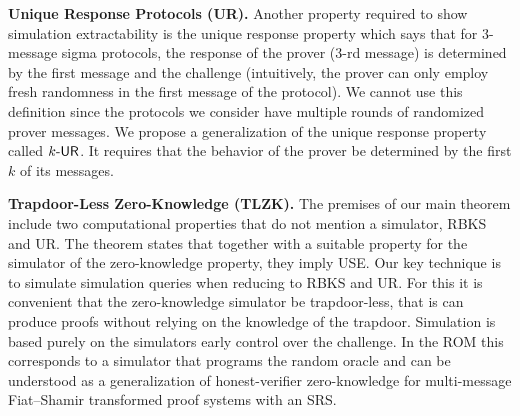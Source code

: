 \documentclass[11pt]{llncs}
\newcommand{\oursubsub}[1] {\smallskip\noindent\textbf{#1}}
\begin{document}
\oursubsub{Unique Response Protocols (UR).}  Another property
required to show simulation extractability is the unique response property which says
that for $3$-message sigma protocols, the response of the prover ($3$-rd message) is determined by the first message and the challenge (intuitively, the prover can only employ fresh randomness in the first
message of the protocol). We cannot use this definition since the protocols
we consider have multiple rounds of randomized prover messages. We propose a generalization of the unique response property called ${k\text{-}\mathsf{UR}}$. It requires that the behavior of the prover be determined by the first
$k$ of its messages. 

\oursubsub{Trapdoor-Less Zero-Knowledge (TLZK).} 
The premises of our main theorem include two computational properties that do not mention a simulator, RBKS and UR. The theorem states that together with a suitable property for the simulator of the zero-knowledge property, they imply USE.
%
Our key technique is to simulate simulation queries when reducing to RBKS and UR. For this it is convenient that the zero-knowledge simulator be trapdoor-less, that is can produce proofs without relying on the
knowledge of the trapdoor. Simulation is based purely on the simulators early control over the challenge. 
%
In the ROM this corresponds to a simulator that programs the random oracle and can be understood as a generalization of
honest-verifier zero-knowledge for multi-message Fiat--Shamir transformed proof systems with an
SRS. 
\end{document}
